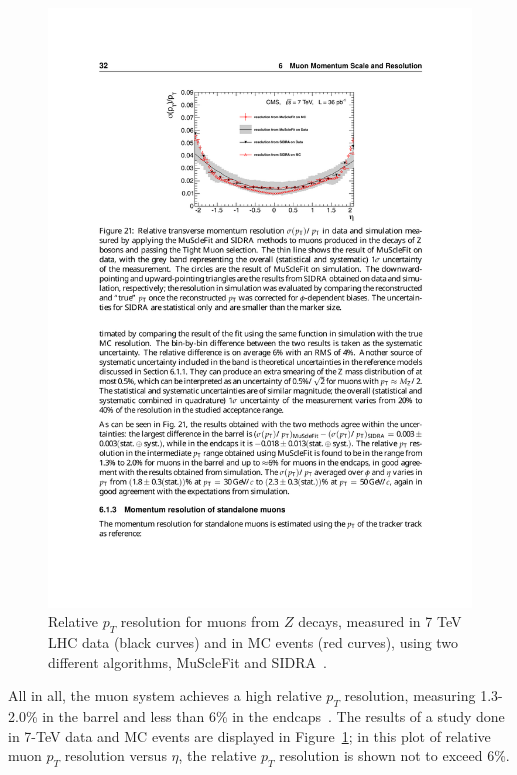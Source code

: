 \begin{figure}[hbtp]
  \begin{center}
    \includegraphics[width=2.0\cmsFigWidth]{figures/cms-muon-performance-Z}
    \caption{Relative $p_T$ resolution for muons from $Z$ decays, measured in 7 TeV LHC data (black curves) and in MC events (red curves), using two different algorithms, MuScleFit and SIDRA~\cite{Chatrchyan:2012xi}.}
    \label{fig:cms-muon-performance}
  \end{center}
\end{figure}

All in all, the muon system achieves a high relative $p_T$ resolution, measuring 1.3-2.0\% in the barrel and less than 6\% in the endcaps~\cite{Chatrchyan:2012xi}. The results of a study done in 7-TeV data and MC events are displayed in Figure~\ref{fig:cms-muon-performance}; in this plot of relative muon $p_T$ resolution versus $\eta$, the relative $p_T$ resolution is shown not to exceed 6\%.

